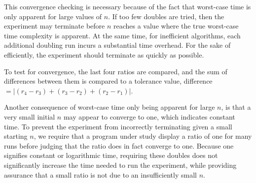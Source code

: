   This convergence checking is necessary because of the fact that worst-case
  time is only apparent for large values of $n$. If too few doubles
  are tried, then the experiment may terminate before $n$ reaches a value
  where the true worst-case time complexity is apparent. At the same time,
  for inefficient  algorithms, each additional doubling run incurs a substantial
  time overhead. For the sake of efficiently, the experiment should
  terminate as quickly as possible.

  To test for convergence, the last four ratios are compared, and the
  sum of differences between them is compared to a tolerance value,
  difference $= |(r_4 - r_3) + (r_3 -r_2) + (r_2 - r_1)|$.


  Another consequence of worst-case time only being apparent for large
  $n$, is that a very small initial $n$ may appear to converge to one,
  which indicates constant time. To prevent the
  experiment from incorrectly terminating given a small starting $n$, we
  require that a program under study display a ratio of one for many
  runs before judging that the ratio does in fact converge to one. Because
  one signifies constant or logarithmic
  time, requiring these doubles does not significantly increase the time needed
  to run the experiment, while providing assurance that a small ratio is not due
  to an insufficiently small $n$.
